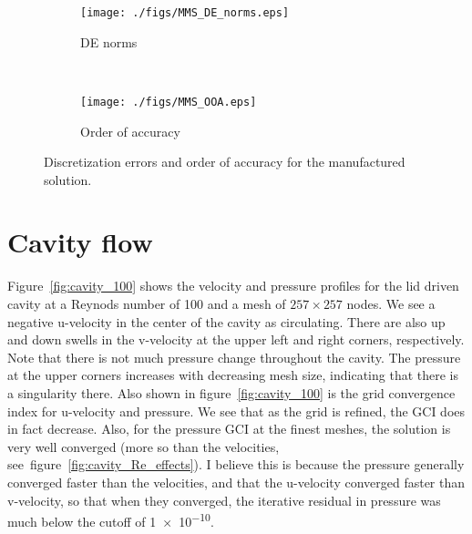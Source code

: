\documentclass[10pt, letterpaper]{article}
\newcommand{\fig}[1]{figure~\ref{#1}}
\newcommand{\mesh}[1]{${#1} \times {#1}$}
\begin{document}
\begin{figure}[h]
	\centering
	\begin{subfigure}[b]{0.475\textwidth}
		\centering
		\texttt{[image: ./figs/MMS\_DE\_norms.eps]}
		\caption{DE norms}
	\end{subfigure}
	~
	\begin{subfigure}[b]{0.475\textwidth}
		\centering
		\texttt{[image: ./figs/MMS\_OOA.eps]}
		\caption{Order of accuracy}
	\end{subfigure}
	\caption{Discretization errors and order of accuracy for the manufactured
		solution.}
	\label{fig:MMS_accuracy}
\end{figure}


\newpage

\section{Cavity flow}

Figure~\ref{fig:cavity_100} shows the velocity and pressure profiles for the
lid driven cavity at a Reynods number of 100 and a mesh of \mesh{257} nodes.
We see a negative u-velocity in the center of the cavity as circulating.  There
are also up and down swells in the v-velocity at the upper left and right corners,
respectively.  Note that there is not much pressure change throughout the
cavity.  The pressure at the upper corners increases with decreasing mesh size,
indicating that there is a singularity there.  Also shown in \fig{fig:cavity_100}
is the grid convergence index for u-velocity and pressure.  We see that as 
the grid is refined, the GCI does in fact decrease.  Also, for the pressure GCI
at the finest meshes, the solution is very well converged (more so than the
velocities, see~\fig{fig:cavity_Re_effects}).  I believe this is because
the pressure generally converged faster than the velocities, and that the 
u-velocity converged faster than v-velocity, so that when they converged, the
iterative residual in pressure was much below the cutoff of \num{1e-10}.
\end{document}
